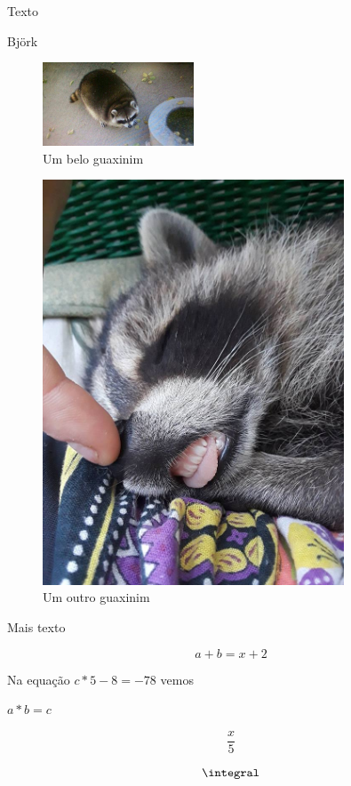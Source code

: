 \documentclass[a4paper, 12pt, oneside]{article}
\begin{document}
\centering Texto

Bj\"ork

\begin{figure}[H]
    \centering
    \includegraphics[width=0.4\textwidth]{B.jpg}
    \caption{Um belo guaxinim}
    \label{fig:guaxinim1}
\end{figure}

\begin{figure}[!H]
    \centering
    \includegraphics[width=0.8\textwidth]{g.jpg}
    \caption{Um outro guaxinim}
    \label{fig:guaxinim2}
\end{figure}

Mais texto

\[ a + b = x + 2\]

Na equação \( c * 5 - 8 = -78\) vemos

$a*b = c $

\[ \frac{x}{5} \]

\[ \integral \]
\end{document}
